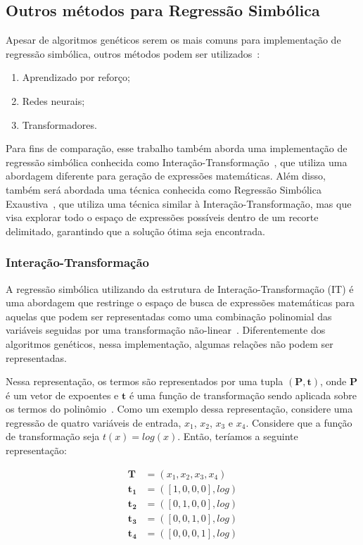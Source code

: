 \subsection{Outros métodos para Regressão Simbólica}

Apesar de algoritmos genéticos serem os mais comuns para implementação de regressão simbólica, outros métodos podem ser utilizados~\cite{Bartlett_2024, Makke2024}:
\begin{enumerate}
    \item Aprendizado por reforço;
    \item Redes neurais;
    \item Transformadores.
\end{enumerate}

Para fins de comparação, esse trabalho também aborda uma implementação de regressão simbólica conhecida como Interação-Transformação~\cite{lsritr}, que utiliza uma abordagem diferente para geração de expressões matemáticas. Além disso, também será abordada uma técnica conhecida como Regressão Simbólica Exaustiva~\cite{Bartlett_2024}, que utiliza uma técnica similar à Interação-Transformação, mas que visa explorar todo o espaço de expressões possíveis dentro de um recorte delimitado, garantindo que a solução ótima seja encontrada.

\subsubsection{Interação-Transformação}

A regressão simbólica utilizando da estrutura de Interação-Transformação (IT) é uma abordagem que restringe o espaço de busca de expressões matemáticas para aquelas que podem ser representadas como uma combinação polinomial das variáveis seguidas por uma transformação não-linear~\cite{lsritr}. Diferentemente dos algoritmos genéticos, nessa implementação, algumas relações não podem ser representadas.

Nessa representação, os termos são representados por uma tupla $(\mathbf{P}, \mathbf{t})$, onde $\mathbf{P}$ é um vetor de expoentes e $\mathbf{t}$ é uma função de transformação sendo aplicada sobre os termos do polinômio~\cite{lsritr}. Como um exemplo dessa representação, considere uma regressão de quatro variáveis de entrada, $x_1$, $x_2$, $x_3$ e $x_4$. Considere que a função de transformação seja $t(x) = log(x)$. Então, teríamos a seguinte representação:

\begin{equation}
  \begin{aligned}
    \mathbf{T} &= (x_1, x_2, x_3, x_4) \\
    \mathbf{t_1} &= ([1, 0, 0, 0], log) \\
    \mathbf{t_2} &= ([0, 1, 0, 0], log) \\
    \mathbf{t_3} &= ([0, 0, 1, 0], log) \\
    \mathbf{t_4} &= ([0, 0, 0, 1], log)
  \end{aligned}
\end{equation}

